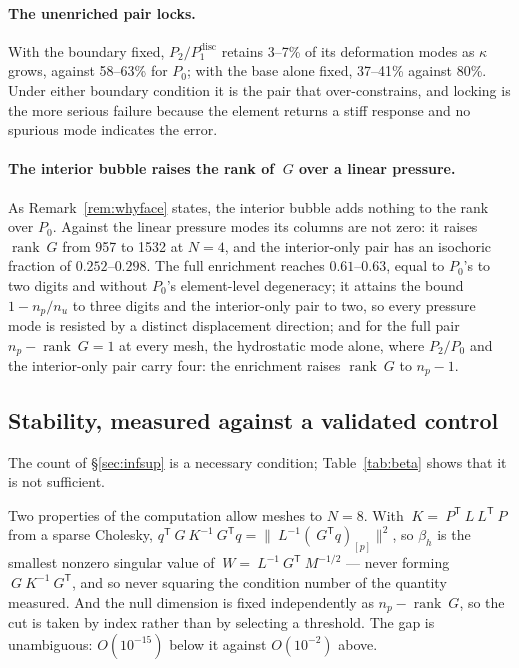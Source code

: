 \documentclass[11pt]{article}
\newcommand{\transpose}[1]{#1^{\mathsf{T}}}
\theoremstyle{definition}
\theoremstyle{plain}
\begin{document}
\paragraph{The unenriched pair locks.} With the boundary fixed,
$P_2/P_1^{\mathrm{disc}}$ retains 3--7\% of its deformation modes as $\kappa$
grows, against 58--63\% for $P_0$; with the base alone fixed, 37--41\%
against 80\%. Under either boundary condition it is the pair that
over-constrains, and locking is the more serious failure because the element
returns a stiff response and no spurious mode indicates the error.

\paragraph{The interior bubble raises the rank of $~G$ over a linear pressure.}
As Remark~\ref{rem:whyface} states, the interior bubble adds nothing to the
rank over $P_0$. Against the linear pressure modes its columns
are not zero: it raises $\operatorname{rank}~G$ from 957 to 1532 at $N = 4$,
and the interior-only pair has an isochoric fraction of $0.252$--$0.298$. The
full enrichment reaches $0.61$--$0.63$, equal to $P_0$'s to two digits and
without $P_0$'s element-level degeneracy; it attains the bound $1 - n_p/n_u$
to three digits and the interior-only pair to two, so every pressure mode is
resisted by a distinct displacement direction; and for the full pair $n_p - \operatorname{rank}~G = 1$ at every mesh,
the hydrostatic mode alone, where $P_2/P_0$ and the interior-only pair carry
four: the enrichment raises $\operatorname{rank}~G$ to $n_p - 1$.

\subsection{Stability, measured against a validated control}
\label{sec:beta}

The count of \S\ref{sec:infsup} is a necessary condition; Table~\ref{tab:beta}
shows that it is not sufficient.

Two properties of the computation allow meshes to $N = 8$. With $~K = \transpose{~P} ~L
\transpose{~L} ~P$ from a sparse Cholesky, $\transpose{q} ~G ~K^{-1}
\transpose{~G} q = \lVert ~L^{-1} (\transpose{~G} q)_{[p]} \rVert^2$, so
$\beta_h$ is the smallest nonzero singular value of $~W = ~L^{-1}
\transpose{~G} ~M^{-1/2}$ --- never forming $~G ~K^{-1} \transpose{~G}$, and so
never squaring the condition number of the quantity measured. And
the null dimension is fixed independently as $n_p - \operatorname{rank}~G$, so
the cut is taken by index rather than by selecting a threshold. The gap is
unambiguous: $O(10^{-15})$ below it against $O(10^{-2})$ above.
\end{document}
